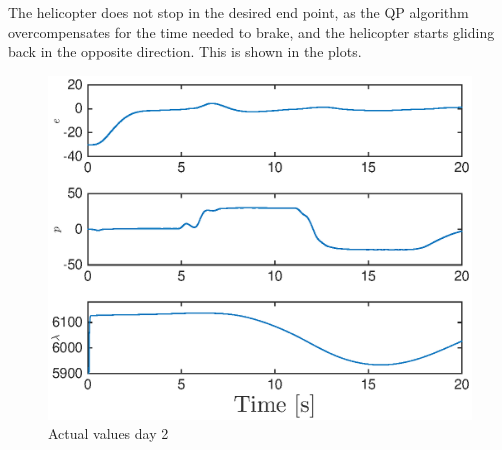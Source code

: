 The helicopter does not stop in the desired end point, as the QP algorithm overcompensates for the time needed to brake, and the helicopter starts gliding back in the opposite direction. This is shown in the plots.

\begin{figure}[H]
	\centering
	\includegraphics[width=\textwidth]{day2}
	\caption{Actual values day 2}
	\label{fig:day2}
\end{figure}
